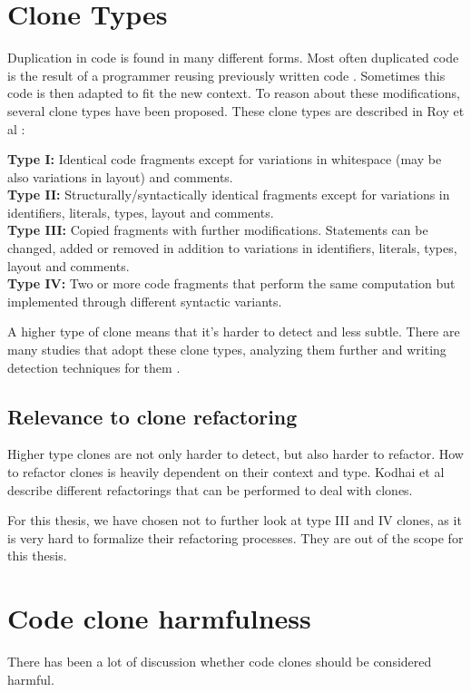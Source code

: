 \section{Clone Types}
Duplication in code is found in many different forms. Most often duplicated code is the result of a programmer reusing previously written code \cite{haefliger2008code, baxter1998clone}. Sometimes this code is then adapted to fit the new context. To reason about these modifications, several clone types have been proposed. These clone types are described in Roy et al \cite{roy2007survey}:
\begin{displayquote}
\textbf{Type I:} Identical code fragments except for variations in whitespace (may be also variations in layout) and comments.\\
\textbf{Type II:} Structurally/syntactically identical fragments except for variations in identifiers, literals, types, layout and comments.\\
\textbf{Type III:} Copied fragments with further modifications. Statements can be changed, added or removed in addition to variations in identifiers, literals, types, layout and comments.\\
\textbf{Type IV:} Two or more code fragments that perform the same computation but implemented through different syntactic variants.
\end{displayquote}
A higher type of clone means that it's harder to detect and less subtle. There are many studies that adopt these clone types, analyzing them further and writing detection techniques for them \cite{sajnani2016sourcerercc, kodhai2010detection, van2019novel}.

\subsection{Relevance to clone refactoring}
Higher type clones are not only harder to detect, but also harder to refactor. How to refactor clones is heavily dependent on their context and type. Kodhai et al \cite{kodhai2013method} describe different refactorings that can be performed to deal with clones.

For this thesis, we have chosen not to further look at type III and IV clones, as it is very hard to formalize their refactoring processes. They are out of the scope for this thesis.

\section{Code clone harmfulness}
There has been a lot of discussion whether code clones should be considered harmful.

